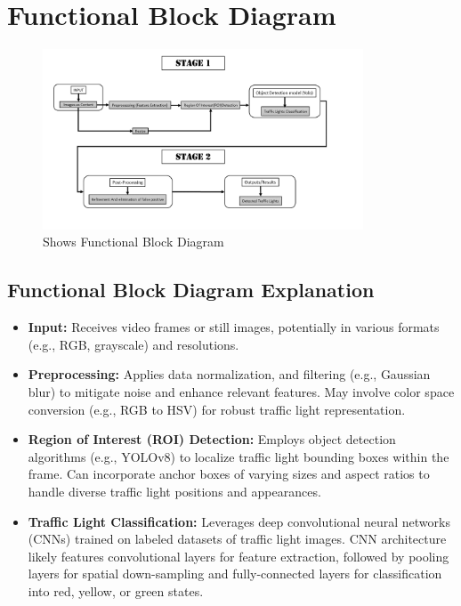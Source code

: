 \documentclass[12 pt]{report}
\begin{document}
\section{Functional Block Diagram}
\begin{figure}[h]
  \centering
  \includegraphics[width=0.85\textwidth]{Fun-Diagram.png}
  \caption{Shows Functional Block Diagram}
  \label{fig:function_block_diagram}
\end{figure}
\subsection{Functional Block Diagram Explanation}
{
  \begin{justify}
  \begin{itemize}
    \item \textbf{Input:} Receives video frames or still images, potentially in various formats (e.g., RGB, grayscale) and resolutions.

    \item \textbf{Preprocessing:} Applies data normalization, and filtering (e.g., Gaussian blur) to mitigate noise and enhance relevant features. May involve color space conversion (e.g., RGB to HSV) for robust traffic light representation.

    \item \textbf{Region of Interest (ROI) Detection:} Employs object detection algorithms (e.g., YOLOv8) to localize traffic light bounding boxes within the frame. Can incorporate anchor boxes of varying sizes and aspect ratios to handle diverse traffic light positions and appearances.

    \item \textbf{Traffic Light Classification:} Leverages deep convolutional neural networks (CNNs) trained on labeled datasets of traffic light images. CNN architecture likely features convolutional layers for feature extraction, followed by pooling layers for spatial down-sampling and fully-connected layers for classification into red, yellow, or green states.
  \end{itemize}
  \end{justify}
}
\end{document}

